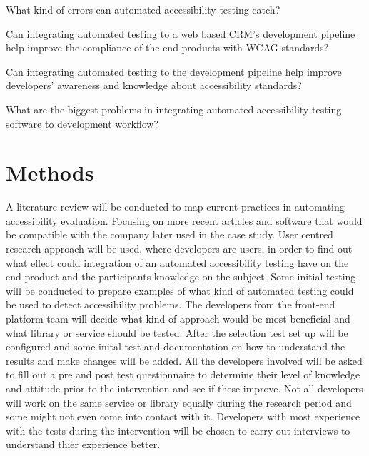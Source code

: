 \documentclass{thesis_proposal}
\begin{document}
\begin{RQlist}
    \item What kind of errors can automated accessibility testing catch?
    \item Can integrating automated testing to a web based CRM’s development pipeline help improve the compliance of the end products with WCAG standards?
    \item Can integrating automated testing to the development pipeline help improve developers’ awareness and knowledge about accessibility standards?
    \item What are the biggest problems in integrating automated accessibility testing software to development workflow?
\end{RQlist}

\section{Methods}
A literature review will be conducted to map current practices in automating accessibility evaluation. Focusing on more recent articles and software that would be compatible with the company later used in the case study.
User centred research approach will be used, where developers are users, in order to find out what effect could integration of an automated accessibility testing have on the end product and the participants knowledge on the subject.
Some initial testing will be conducted to prepare examples of what kind of automated testing could be used to detect accessibility problems. The developers from the front-end platform team will decide what kind of approach would be most beneficial and what library or service should be tested.
After the selection test set up will be configured and some inital test and documentation on how to understand the results and make changes will be added.
All the developers involved will be asked to fill out a pre and post test questionnaire to determine their level of knowledge and attitude prior to the intervention and see if these improve. Not all developers will work on the same service or library equally during the research period and some might not even come into contact with it. Developers with most experience with the tests during the intervention will be chosen to carry out interviews to understand thier experience better.
\end{document}

